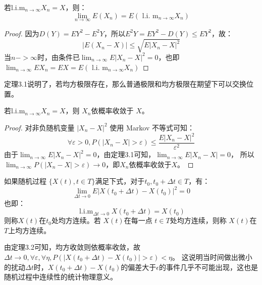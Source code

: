 \begin{theorem}
  若$\mathrm{l.i.m}_{n \rightarrow \infty} X_n=X$，则：
  \begin{equation}
    \lim _{n \rightarrow \infty} E\left(X_n\right)=E\left(\text { l.i. } \mathrm{m}_{n \rightarrow \infty} X_n\right)
  \end{equation}
\end{theorem}

\begin{proof}
  因为$D(Y)=E Y^2-E^2 Y$，所以$E^2Y = EY^2 - D(Y) \leq EY^2$，故：
  \begin{equation}
    \left|E\left(X_n-X\right)\right| \leq \sqrt{E\left|X_n-X\right|^2}
  \end{equation}
  当$n->\infty$时，由条件已$\lim _{n \rightarrow \infty} E\left|X_n-X\right|^2=0$，也即
  $\lim _{n \rightarrow \infty} E X_n=E X=E\left(\right.$ l.i. $\left.\mathrm{m}_{n \rightarrow \infty} X_n\right)$
\end{proof}
定理3.1说明了，若均方极限存在，那么普通极限和均方极限在期望下可以交换位置。

\begin{theorem}
  若$\mathrm{l.i.m}_{n \rightarrow \infty} X_n=X$，则 $X_n$依概率收敛于 $X$。
\end{theorem}

\begin{proof}
  对非负随机变量 $|X_n-X|^2$ 使用 Markov 不等式可知：
  $$
  \forall \varepsilon>0, P\left(\left|X_n-X\right|>\varepsilon\right) \leq \frac{E\left|X_n-X\right|^2}{\varepsilon^2}
  $$
  由于$\lim _{n \rightarrow \infty} E\left|X_n-X\right|^2=0$，由定理3.1可知，$\lim _{n \rightarrow \infty} E\left|X_n-X\right|=0$，
  所以$\lim _{n \rightarrow \infty} P\left(\left|X_n-X\right|>\varepsilon\right) \rightarrow 0$，即$X_n$依概率收敛于$X$。
\end{proof}

\begin{definition}
  如果随机过程 $\{X(t), t\in T\}$满足下式，对于$t_0, t_0 + \Delta t \in T $，有：
  $$
\lim _{\Delta t \rightarrow 0} E\left|X\left(t_0+\Delta t\right)-X\left(t_0\right)\right|^2=0
$$
也即：
$$
\operatorname{l.i.m}_{\Delta t\to0} X\left(t_0+\Delta t\right)=X\left(t_0\right)
$$
则称$X(t)$在$t_0$处均方连续。若 $X(t)$在每一点 $t \in T$处均方连续，则称 $X(t)$在$T$上均方连续。
\end{definition}
由定理3.2可知，均方收敛则依概率收敛，故$\Delta t \rightarrow 0, \forall \varepsilon, \forall \eta, P\left(\left|X\left(t_0+\Delta t\right)-X\left(t_0\right)\right|>\varepsilon\right)<\eta$。
这说明当时间做出微小的扰动$\Delta t$时，$X(t_0 + \Delta t) - X(t_0)$的偏差大于$\epsilon$的事件几乎不可能出现，这也是随机过程中连续性的统计物理意义。

